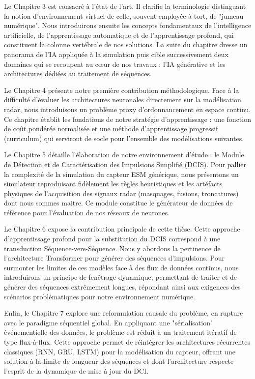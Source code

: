 Le Chapitre 3 est consacré à l'état de l'art. Il clarifie la terminologie distinguant la notion d'environnement virtuel de celle, souvent employée à tort, de "jumeau numérique". Nous introduirons ensuite les concepts fondamentaux de l'intelligence artificielle, de l'apprentissage automatique et de l'apprentissage profond, qui constituent la colonne vertébrale de nos solutions. La suite du chapitre dresse un panorama de l'IA appliquée à la simulation puis cible successivement deux domaines qui se recoupent au cœur de nos travaux : l'IA générative et les architectures dédiées au traitement de séquences.

Le Chapitre 4 présente notre première contribution méthodologique. Face à la difficulté d'évaluer les architectures neuronales directement sur la modélisation radar, nous introduisons un problème proxy d'ordonnancement en espace continu. Ce chapitre établit les fondations de notre stratégie d'apprentissage : une fonction de coût pondérée normalisée et une méthode d'apprentissage progressif (curriculum) qui serviront de socle pour l'ensemble des modélisations suivantes.

Le Chapitre 5 détaille l'élaboration de notre environnement d'étude : le Module de Détection et de Caractérisation des Impulsions Simplifié (DCIS). Pour pallier la complexité de la simulation du capteur ESM générique, nous présentons un simulateur reproduisant fidèlement les règles heuristiques et les artéfacts physiques de l'acquisition des signaux radar (masquages, fusions, troncatures) dont nous sommes maitre. Ce module constitue le générateur de données de référence pour l'évaluation de nos réseaux de neurones.

Le Chapitre 6 expose la contribution principale de cette thèse. Cette approche d'apprentissage profond pour la substitution du DCIS correspond à une transduction Séquence-vers-Séquence. Nous y abordons la pertinence de l'architecture Transformer pour générer des séquences d'impulsions. Pour surmonter les limites de ces modèles face à des flux de données continus, nous introduirons un principe de fenêtrage dynamique, permettant de traiter et de générer des séquences extrêmement longues, répondant ainsi aux exigences des scénarios problématiques pour notre environnement numérique.

Enfin, le Chapitre 7 explore une reformulation causale du problème, en rupture avec le paradigme séquentiel global. En appliquant une "sérialisation" événementielle des données, le problème est réduit à un traitement itératif de type flux-à-flux. Cette approche permet de réintégrer les architectures récurrentes classiques (RNN, GRU, LSTM) pour la modélisation du capteur, offrant une solution à la limite de longueur des séquences et dont l'architecture respecte l'esprit de la dynamique de mise à jour du DCI.